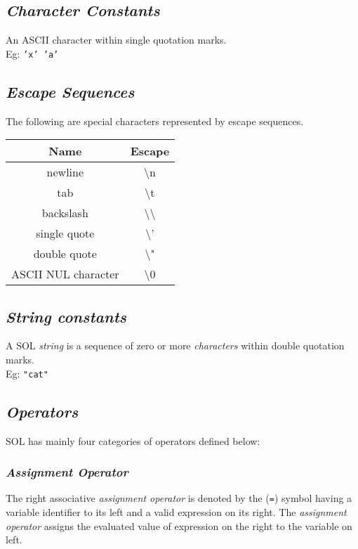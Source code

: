     \subsection{\textit{Character Constants}}
    An ASCII character within single quotation marks.\\
    Eg: \texttt{'x' 'a'}

    \subsection{\textit{Escape Sequences}}
    The following are special characters represented by escape sequences.
        \begin{center}
            \begin{tabular}{ |c|c| }
            \hline
                \textbf{Name}   & \textbf{Escape}\\
                \hline
                newline         & \textbackslash n\\
                tab             & \textbackslash t\\
                backslash       & \textbackslash \textbackslash\\
                single quote    & \textbackslash '\\
                double quote    & \textbackslash "\\
                ASCII NUL character & \textbackslash 0\\
            \hline
            \end{tabular}
        \end{center}

    \subsection{\textit{String constants}}
    A SOL \textit{string} is a sequence of zero or more \textit{characters} within double quotation marks.\\
    Eg: \texttt{"cat"}

    \subsection{\textit{Operators}}
    SOL has mainly four categories of operators defined below:

        \subsubsection{\textit{Assignment Operator}}
        The right associative \textit{assignment operator} is denoted by the (\texttt{=}) symbol having a variable identifier to its left and a valid expression on its right. The \textit{assignment operator} assigns the evaluated value of expression on the right to the variable on left.

